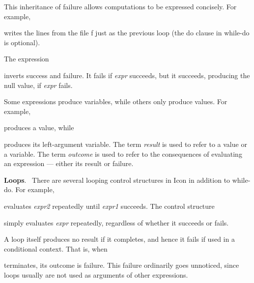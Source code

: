 This {\textquotedbl}inheritance{\textquotedbl} of failure allows computations to be expressed concisely. For example,



\noindent writes the lines from the file f just as the previous loop
(the do clause in while-do is optional).

The expression



\noindent inverts success and failure. It fails if \textit{expr}
succeeds, but it succeeds, producing the null value, if \textit{expr}
fails.

Some expressions produce variables, while others only produce
values. For example,



\noindent produces a value, while



\noindent produces its left-argument variable. The term
\textit{result} is used to refer to a value or a variable. The term
\textit{outcome }is used to refer to the consequences of evaluating an
expression --- either its result or failure.

\textbf{Loops}. \ There are several looping control structures in Icon in addition to while-do. For example,



\noindent evaluates \textit{expr2} repeatedly until \textit{expr1}
succeeds. The control structure



\noindent simply evaluates \textit{expr} repeatedly, regardless of
whether it succeeds or fails.

A loop itself produces no result if it completes, and hence it fails
if used in a conditional context. That is, when



\noindent terminates, its outcome is failure. This failure ordinarily
goes unnoticed, since loops usually are not used as arguments of other
expressions.


